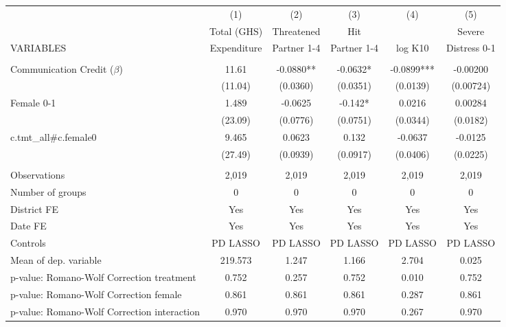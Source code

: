 \begin{tabular}{lccccc} \hline
 & (1) & (2) & (3) & (4) & (5) \\
 & Total (GHS) & Threatened & Hit &  & Severe \\
VARIABLES & Expenditure & Partner 1-4 & Partner 1-4 & log K10 & Distress 0-1 \\ \hline
 &  &  &  &  &  \\
Communication Credit ($\beta$) & 11.61 & -0.0880** & -0.0632* & -0.0899*** & -0.00200 \\
 & (11.04) & (0.0360) & (0.0351) & (0.0139) & (0.00724) \\
Female 0-1 & 1.489 & -0.0625 & -0.142* & 0.0216 & 0.00284 \\
 & (23.09) & (0.0776) & (0.0751) & (0.0344) & (0.0182) \\
c.tmt\_all\#c.female0 & 9.465 & 0.0623 & 0.132 & -0.0637 & -0.0125 \\
 & (27.49) & (0.0939) & (0.0917) & (0.0406) & (0.0225) \\
 &  &  &  &  &  \\
Observations & 2,019 & 2,019 & 2,019 & 2,019 & 2,019 \\
Number of groups & 0 & 0 & 0 & 0 & 0 \\
District FE & Yes & Yes & Yes & Yes & Yes \\
Date FE & Yes & Yes & Yes & Yes & Yes \\
Controls & PD LASSO & PD LASSO & PD LASSO & PD LASSO & PD LASSO \\
Mean of dep. variable & 219.573 & 1.247 & 1.166 & 2.704 & 0.025 \\
p-value: Romano-Wolf Correction treatment & 0.752 & 0.257 & 0.752 & 0.010 & 0.752 \\
p-value: Romano-Wolf Correction female & 0.861 & 0.861 & 0.861 & 0.287 & 0.861 \\
 p-value: Romano-Wolf Correction interaction & 0.970 & 0.970 & 0.970 & 0.267 & 0.970 \\ \hline
\end{tabular}

